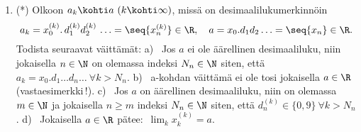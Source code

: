\begin{enumerate}
\item (*)
Olkoon $a_k \kohti a\ (k \kohti \infty)$, missä on desimaalilukumerkinnöin 
\[
a_k=x_0^{(k)}.\,d_1^{(k)}d_2^{(k)}\,\ldots =\seq{x_n^{(k)}} \in\R, \quad a
                                           =x_0.d_1d_2\ldots = \seq{x_n} \in\R.
\]
Todista seuraavat väittämät: \newline
a) \ Jos $a$ ei ole äärellinen desimaaliluku, niin jokaisella $n\in\N$ on olemassa indeksi 
$N_n\in\N$ siten, että \ $a_k = x_0.d_1 \ldots d_n \ldots\ \forall k>N_n$. \newline
b) \ a-kohdan väittämä ei ole tosi jokaisella $a\in\R$ (vastaesimerkki\,!). \newline
c) \ Jos $a$ on äärellinen desimaaliluku, niin on olemassa $m\in\N$ ja jokaisella $n \ge m$ 
indeksi $N_n\in\N$ siten, että $d_n^{(k)}\in\{0,9\}\ \forall k>N_n$. \newline
d) \ Jokaisella $a\in\R$ pätee: $\,\lim_k x_k^{(k)}=a$.

\end{enumerate}